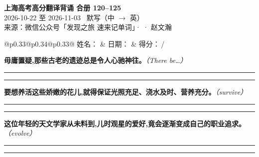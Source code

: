 \documentclass[11pt,a4paper]{article}
\newcommand{\num}[1]{\makebox[1.9em][r]{#1.}\hspace{0.3em}}
\newcommand{\wline}{\noindent\rule{\linewidth}{0.4pt}}
\newcommand{\prompt}[1]{\emph{\textcolor{tipblue}{\small（#1）}}}
\begin{document}
\pagestyle{plain}
\begin{center}
{\LARGE\bfseries 上海高考高分翻译背诵 \quad 合册 120–125}\\[0.25em]
{\large 2026-10-22 至 2026-11-03 \quad\ 默写（中 $\to$ 英）}\\[0.35em]
{\footnotesize 来源：微信公众号「发现之旅 速来记单词」·  · 赵文瀚}
\end{center}

\vspace{0.4em}
\noindent\begin{tabular}{@{}p{0.33\textwidth}@{}p{0.34\textwidth}@{}p{0.33\textwidth}@{}}
姓名：\underline{\hspace{2.0cm}} & 日期：\underline{\hspace{2.0cm}} & 得分：\underline{\hspace{1.4cm}}\,/ \\
\end{tabular}

\vspace{0.5em}

\vspace{0.8em}
\vspace{0.35em}\vspace{0.15em}

\begin{minipage}{\linewidth}

\num{1}\textbf{毋庸置疑,那些古老的遗迹总是令人心驰神往。}\prompt{There be…}

\vspace{0.3em}

\wline\vspace{0.3em}
\wline

\end{minipage}

\begin{minipage}{\linewidth}

\num{2}\textbf{要想养活这些娇嫩的花儿,就得保证光照充足、浇水及时、营养充分。}\prompt{survive}

\vspace{0.3em}

\wline\vspace{0.3em}
\wline

\end{minipage}

\begin{minipage}{\linewidth}

\num{3}\textbf{这位年轻的天文学家从未料到,儿时观星的爱好,竟会逐渐变成自己的职业追求。}\prompt{evolve}

\vspace{0.3em}

\wline\vspace{0.3em}
\wline

\end{minipage}
\end{document}
